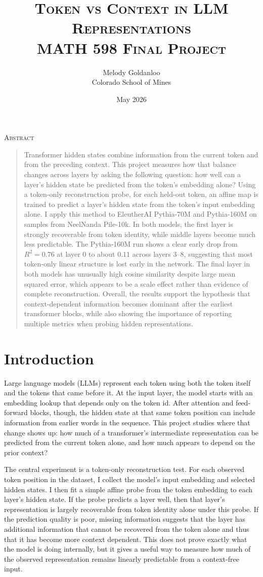 \documentclass[10pt]{article}
\title{\textsc{Token vs Context in LLM Representations}\\[0.4em]
\large\textsc{MATH 598 Final Project}}
\author{Melody Goldanloo \\
    Colorado School of Mines}
\date{May 2026}
\renewenvironment{abstract}{%
  \begin{center}
    \textsc{Abstract}
  \end{center}
  \begin{quote}\small
}{%
  \end{quote}
}
\begin{document}
\maketitle

\begin{abstract}
Transformer hidden states combine information from the current token and from the preceding context. This project measures how that balance changes across layers by asking the following question: how well can a layer's hidden state be predicted from the token's embedding alone? Using a token-only reconstruction probe, for each held-out token, an affine map is trained to predict a layer's hidden state from the token's input embedding alone. I apply this method to EleutherAI Pythia-70M and Pythia-160M on samples from NeelNanda Pile-10k. In both models, the first layer is strongly recoverable from token identity, while middle layers become much less predictable. The Pythia-160M run shows a clear early drop from $R^2=0.76$ at layer 0 to about $0.11$ across layers 3--8, suggesting that most token-only linear structure is lost early in the network. The final layer in both models has unusually high cosine similarity despite large mean squared error, which appears to be a scale effect rather than evidence of complete reconstruction. Overall, the results support the hypothesis that context-dependent information becomes dominant after the earliest transformer blocks, while also showing the importance of reporting multiple metrics when probing hidden representations.
\end{abstract}

\section{Introduction}

Large language models (LLMs) represent each token using both the token itself and the tokens that came before it. At the input layer, the model starts with an embedding lookup that depends only on the token id. After attention and feed-forward blocks, though, the hidden state at that same token position can include information from earlier words in the sequence. This project studies where that change shows up: how much of a transformer's intermediate representation can be predicted from the current token alone, and how much appears to depend on the prior context?

The central experiment is a token-only reconstruction test. For each observed token position in the dataset, I collect the model's input embedding and selected hidden states. I then fit a simple affine probe from the token embedding to each layer's hidden state. If the probe predicts a layer well, then that layer's representation is largely recoverable from token identity alone under this probe. If the prediction quality is poor, missing information suggests that the layer has additional information that cannot be recovered from the token alone and thus that it has become more context dependent. This does not prove exactly what the model is doing internally, but it gives a useful way to measure how much of the observed representation remains linearly predictable from a context-free input.
\end{document}
